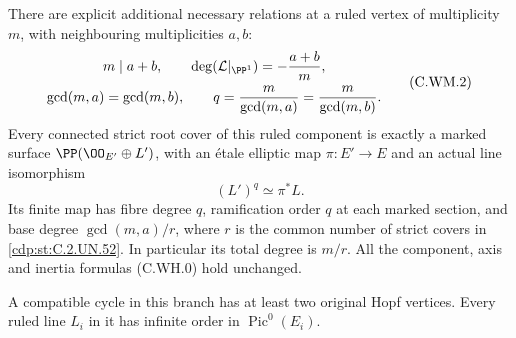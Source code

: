 \begin{proposition}
There are explicit additional necessary relations at a ruled
vertex of multiplicity $m$, with neighbouring multiplicities
$a,b$:
\[
 \begin{gathered}
      m\mid a+b,\qquad
      \deg(\mathcal L|_{\PP^1})=-\frac{a+b}{m},\\
      \gcd(m,a)=\gcd(m,b),\qquad
      q=\frac{m}{\gcd(m,a)}
         =\frac{m}{\gcd(m,b)}.
 \end{gathered}
\tag{C.WM.2}\label{cdp:eq:C.WM.2}
\]
Every connected strict root cover of this ruled component
is exactly a marked surface
$\PP(\OO_{E'}\oplus L')$, with an \'{e}tale elliptic map
$\pi:E'\to E$ and an actual line isomorphism
\[
                   (L')^q\simeq\pi^*L.
\tag{C.WM.3}\label{cdp:eq:C.WM.3}
\]
Its finite map has fibre degree $q$, ramification order
$q$ at each marked section, and base degree
$\gcd(m,a)/r$, where $r$ is the common number of strict
covers in \ref{cdp:st:C.2.UN.52}. In particular its total degree is $m/r$.
All the component, axis and inertia formulas (C.WH.0)
hold unchanged.

A compatible cycle in this branch has at least two
original Hopf vertices. Every ruled line $L_i$ in it
has infinite order in $\operatorname{Pic}^0(E_i)$.
\end{proposition}

